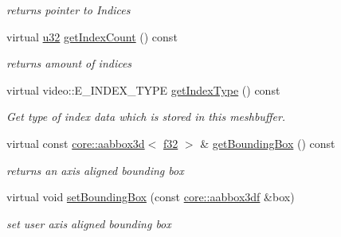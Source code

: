 \begin{DoxyCompactItemize}
\begin{DoxyCompactList}\small\item\em returns pointer to Indices \end{DoxyCompactList}\item 
\mbox{\label{structirr_1_1scene_1_1SSharedMeshBuffer_a97a95470c8956fc0120466e57698081a}} 
virtual \hyperlink{namespaceirr_a0416a53257075833e7002efd0a18e804}{u32} \hyperlink{structirr_1_1scene_1_1SSharedMeshBuffer_a97a95470c8956fc0120466e57698081a}{get\+Index\+Count} () const
\begin{DoxyCompactList}\small\item\em returns amount of indices \end{DoxyCompactList}\item 
\mbox{\label{structirr_1_1scene_1_1SSharedMeshBuffer_af9d02a1f61c5498cbe21be8185d1c803}} 
virtual video\+::\+E\+\_\+\+I\+N\+D\+E\+X\+\_\+\+T\+Y\+PE \hyperlink{structirr_1_1scene_1_1SSharedMeshBuffer_af9d02a1f61c5498cbe21be8185d1c803}{get\+Index\+Type} () const
\begin{DoxyCompactList}\small\item\em Get type of index data which is stored in this meshbuffer. \end{DoxyCompactList}\item 
\mbox{\label{structirr_1_1scene_1_1SSharedMeshBuffer_a5a736dee60a5f5ebc929dc03c0763082}} 
virtual const \hyperlink{classirr_1_1core_1_1aabbox3d}{core\+::aabbox3d}$<$ \hyperlink{namespaceirr_a0277be98d67dc26ff93b1a6a1d086b07}{f32} $>$ \& \hyperlink{structirr_1_1scene_1_1SSharedMeshBuffer_a5a736dee60a5f5ebc929dc03c0763082}{get\+Bounding\+Box} () const
\begin{DoxyCompactList}\small\item\em returns an axis aligned bounding box \end{DoxyCompactList}\item 
\mbox{\label{structirr_1_1scene_1_1SSharedMeshBuffer_a54e11fd284245c3f5e5e07145ad4a202}} 
virtual void \hyperlink{structirr_1_1scene_1_1SSharedMeshBuffer_a54e11fd284245c3f5e5e07145ad4a202}{set\+Bounding\+Box} (const \hyperlink{namespaceirr_1_1core_a60f4b4c744aba55f10530d503c6ecb04}{core\+::aabbox3df} \&box)
\begin{DoxyCompactList}\small\item\em set user axis aligned bounding box \end{DoxyCompactList}\item 

\end{DoxyCompactItemize}
